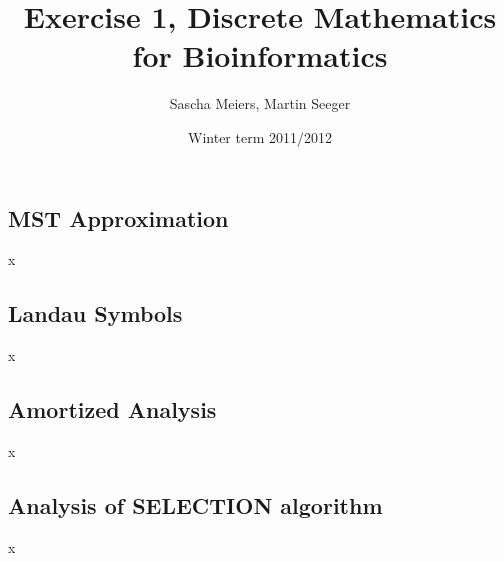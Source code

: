 \documentclass[a4paper]{article}
\author{Sascha Meiers, Martin Seeger}
\title{Exercise 1, Discrete Mathematics for Bioinformatics}
\date{Winter term 2011/2012}
\begin{document}
\maketitle


\subsection{MST Approximation}

x

\subsection{Landau Symbols}

x

\subsection{Amortized Analysis}

x

\subsection{Analysis of SELECTION algorithm}

x
\end{document}
